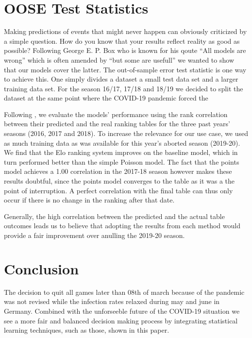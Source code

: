 \documentclass[12pt,a4paper]{article}
\begin{document}
\hypertarget{oose-test-statistics}{%
\section{OOSE Test Statistics}\label{oose-test-statistics}}

Making predictions of events that might never happen can obviously
criticized by a simple question. How do you know that your results
reflect reality as good as possible? Following George E. P. Box who is
known for his qoute \enquote{All models are wrong} which is often
amended by \enquote{but some are usefull} we wanted to show that our
models cover the latter. The out-of-sample error test statistic is one
way to achieve this. One simply divides a dataset a small test data set
and a larger training data set. For the season 16/17, 17/18 and 18/19 we
decided to split the dataset at the same point where the COVID-19
pandemic forced the

Following \textcite{leitner2010}, we evaluate the models' performance
using the rank correlation between their predicted and the real ranking
tables for the three past years' seasons (2016, 2017 and 2018). To
increase the relevance for our use case, we used as much training data
as was available for this year's aborted season (2019-20). We find that
the Elo ranking system improves on the baseline model, which in turn
performed better than the simple Poisson model. The fact that the points
model achieves a 1.00 correlation in the 2017-18 season however makes
these results doubtful, since the points model converges to the table as
it was a the point of interruption. A perfect correlation with the final
table can thus only occur if there is no change in the ranking after
that date.

Generally, the high correlation between the predicted and the actual
table outcomes leads us to believe that adopting the results from each
method would provide a fair improvement over anulling the 2019-20
season.





\hypertarget{conclusion}{%
\section{Conclusion}\label{conclusion}}

The decision to quit all games later than 08th of march because of the
pandemic was not revised while the infection rates relaxed during may
and june in Germany. Combined with the unforseeble future of the
COVID-19 situation we see a more fair and balanced decision making
process by integrating statistical learning techniques, such as those,
shown in this paper.
\end{document}
